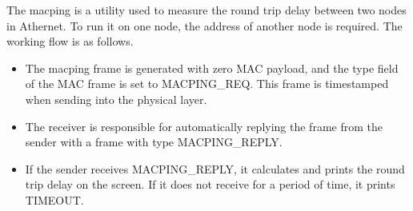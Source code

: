 \documentclass[11pt, conference]{IEEEtran}
\begin{document}
The \textsf{macping} is a utility used to measure the round trip delay between two nodes in Athernet. To run it on one node, the address of another node is required. The working flow is as follows.
\begin{itemize}
\item The \textsf{macping} frame is generated with zero MAC payload, and the type field of the MAC frame is set to \textsf{MACPING\_REQ}. This frame is timestamped when sending into the physical layer.
\item The receiver is responsible for automatically replying the frame from the sender with a frame with type \textsf{MACPING\_REPLY}.
\item If the sender receives \textsf{MACPING\_REPLY}, it calculates and prints the round trip delay on the screen. If it does not receive for a period of time, it prints \textsf{TIMEOUT}.
\end{itemize}
\end{document}
